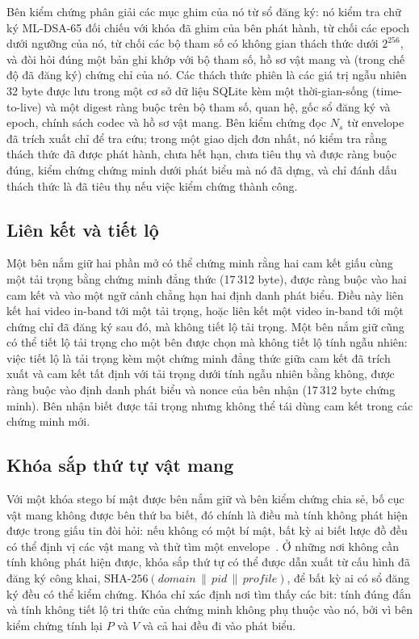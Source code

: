 \documentclass[journal]{IEEEtran}
\newcommand{\pid}{\mathit{pid}}
\begin{document}
Bên kiểm chứng phân giải các mục ghim của nó từ sổ đăng ký: nó kiểm tra chữ ký
ML-DSA-65 đối chiếu với khóa đã ghim của bên phát hành, từ chối các epoch dưới
ngưỡng của nó, từ chối các bộ tham số có không gian thách thức dưới $2^{256}$,
và đòi hỏi đúng một bản ghi khớp với bộ tham số, hồ sơ vật mang và (trong chế độ
đã đăng ký) chứng chỉ của nó. Các thách thức phiên là các giá trị ngẫu nhiên 32
byte được lưu trong một cơ sở dữ liệu SQLite kèm một thời-gian-sống
(time-to-live) và một digest ràng buộc trên bộ tham số, quan hệ, gốc sổ đăng ký
và epoch, chính sách codec và hồ sơ vật mang. Bên kiểm chứng đọc $N_s$ từ
envelope đã trích xuất chỉ để tra cứu; trong một giao dịch đơn nhất, nó kiểm tra
rằng thách thức đã được phát hành, chưa hết hạn, chưa tiêu thụ và được ràng buộc
đúng, kiểm chứng chứng minh dưới phát biểu mà nó đã dựng, và chỉ đánh dấu thách
thức là đã tiêu thụ nếu việc kiểm chứng thành công.

\subsection{Liên kết và tiết lộ}
\label{sec:linkage}
Một bên nắm giữ hai phần mở có thể chứng minh rằng hai cam kết giấu cùng một
tải trọng bằng chứng minh đẳng thức (17\,312 byte), được ràng buộc vào hai cam
kết và vào một ngữ cảnh chẳng hạn hai định danh phát biểu. Điều này liên kết hai
video in-band tới một tải trọng, hoặc liên kết một video in-band tới một chứng
chỉ đã đăng ký sau đó, mà không tiết lộ tải trọng. Một bên nắm giữ cũng có thể
tiết lộ tải trọng cho một bên được chọn mà không tiết lộ tính ngẫu nhiên: việc
tiết lộ là tải trọng kèm một chứng minh đẳng thức giữa cam kết đã trích xuất và
cam kết tất định với tải trọng dưới tính ngẫu nhiên bằng không, được ràng buộc
vào định danh phát biểu và nonce của bên nhận (17\,312 byte chứng minh). Bên
nhận biết được tải trọng nhưng không thể tái dùng cam kết trong các chứng minh
mới.

\subsection{Khóa sắp thứ tự vật mang}
\label{sec:orderkey}
Với một khóa stego bí mật được bên nắm giữ và bên kiểm chứng chia sẻ, bố cục vật
mang không được bên thứ ba biết, đó chính là điều mà tính không phát hiện được
trong giấu tin đòi hỏi: nếu không có một bí mật, bất kỳ ai biết lược đồ đều có
thể định vị các vật mang và thử tìm một envelope~\cite{ref:simmons}. Ở những nơi
không cần tính không phát hiện được, khóa sắp thứ tự có thể được dẫn xuất từ cấu
hình đã đăng ký công khai,
$\mathrm{SHA\mbox{-}256}(\mathit{domain}\,\|\,\pid\,\|\,\mathit{profile})$, để
bất kỳ ai có sổ đăng ký đều có thể kiểm chứng. Khóa chỉ xác định nơi tìm thấy
các bit: tính đúng đắn và tính không tiết lộ tri thức của chứng minh không phụ
thuộc vào nó, bởi vì bên kiểm chứng tính lại $P$ và $V$ và cả hai đều đi vào
phát biểu.
\end{document}
